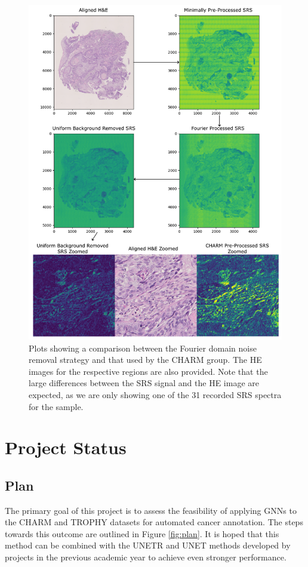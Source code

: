 \begin{figure}[h]
    \centering
    \includegraphics[width=1\linewidth]{Images/different_processing_compare.png}
    \caption{\centering Plots showing a comparison between the Fourier domain noise removal strategy and that used by the CHARM group. The HE images for the respective regions are also provided. Note that the large differences between the SRS signal and the HE image are expected, as we are only showing one of the 31 recorded SRS spectra for the sample.}
    \label{fig:different_process}
\end{figure}

\section{Project Status}
\subsection{Plan} \label{sec:plan}
The primary goal of this project is to assess the feasibility of applying GNNs to the CHARM and TROPHY datasets for automated cancer annotation. The steps towards this outcome are outlined in Figure \ref{fig:plan}. It is hoped that this method can be combined with the UNETR and UNET methods developed by projects in the previous academic year to achieve even stronger performance.

